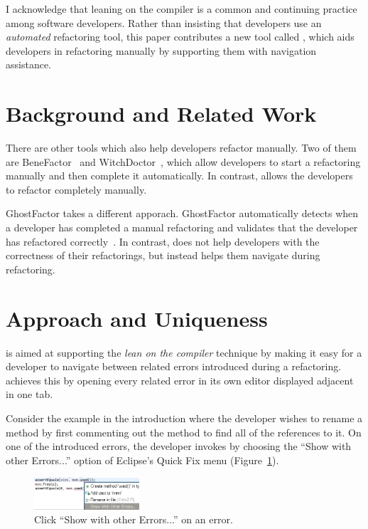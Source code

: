 \documentclass{sigplanconf}
\begin{document}
I acknowledge that leaning on the compiler is a common and continuing practice
among software developers. Rather than insisting that developers use an
\textit{automated} refactoring tool, this paper contributes a new tool
called \pname{}, which aids developers in refactoring
manually by supporting them with navigation assistance.

\section{Background and Related Work}
There are other tools which also help developers refactor manually. Two of them
are
BeneFactor~\cite{bene-factor} and WitchDoctor~\cite{witch-doctor},
which allow developers to start a refactoring manually and then
complete it automatically.
In contrast, \pname{} allows the developers to refactor completely manually.

GhostFactor takes a different apporach. GhostFactor automatically detects
when a developer has completed a manual refactoring and validates
that the developer has refactored correctly~\cite{ghost-factor}.
In contrast, \pname{} does not help developers with the correctness of
their refactorings, but instead helps them navigate during refactoring.

\section{Approach and Uniqueness}
\pname{} is aimed at supporting the \textit{lean on the compiler} technique
by making it easy for a developer to navigate between related errors introduced
during a refactoring. \pname{} achieves this by opening every related error
in its own editor displayed adjacent in one tab.

Consider the example in the introduction where the developer
wishes to rename a method by first commenting out
the method to find all of the references to it.
On one of the introduced errors, the developer invokes \pname{} by choosing
the ``Show with other Errors...'' option of Eclipse's Quick Fix
menu (Figure~\ref{quick}).

\begin{figure}[h]
\begin{center}
\includegraphics[width=0.35\textwidth]{quick-fix.png}
\caption{Click ``Show with other Errors...'' on an error.\label{quick}}
\end{center}
\end{figure}
\end{document}

